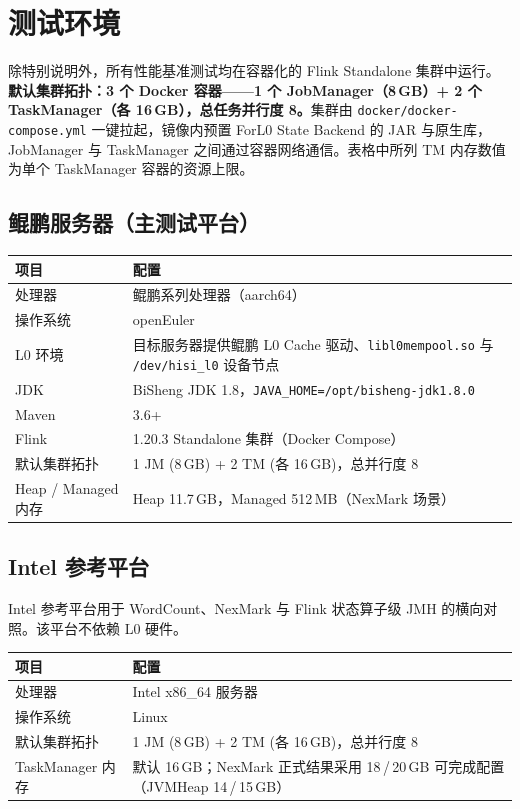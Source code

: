 \documentclass[a4paper,11pt]{article}
\newcommand{\project}{ForL0 State Backend}
\begin{document}
\section{测试环境}

除特别说明外，所有性能基准测试均在容器化的 Flink Standalone 集群中运行。\textbf{默认集群拓扑：3 个 Docker 容器——1 个 JobManager（8\,GB）+ 2 个 TaskManager（各 16\,GB），总任务并行度 8。}集群由 \texttt{docker/docker-compose.yml} 一键拉起，镜像内预置 \project{} 的 JAR 与原生库，JobManager 与 TaskManager 之间通过容器网络通信。表格中所列 TM 内存数值为单个 TaskManager 容器的资源上限。

\subsection{鲲鹏服务器（主测试平台）}

\begin{table}[H]
\centering
\small
\begin{tabularx}{\textwidth}{L{3.2cm} X}
\toprule
\textbf{项目} & \textbf{配置} \\
\midrule
处理器 & 鲲鹏系列处理器（aarch64） \\
操作系统 & openEuler \\
L0 环境 & 目标服务器提供鲲鹏 L0 Cache 驱动、\texttt{libl0mempool.so} 与 \texttt{/dev/hisi\_l0} 设备节点 \\
JDK & BiSheng JDK 1.8，\texttt{JAVA\_HOME=/opt/bisheng-jdk1.8.0} \\
Maven & 3.6+ \\
Flink & 1.20.3 Standalone 集群（Docker Compose） \\
默认集群拓扑 & 1 JM (8\,GB) + 2 TM (各 16\,GB)，总并行度 8 \\
Heap / Managed 内存 & Heap 11.7\,GB，Managed 512\,MB（NexMark 场景） \\
\bottomrule
\end{tabularx}
\end{table}

\subsection{Intel 参考平台}

Intel 参考平台用于 WordCount、NexMark 与 Flink 状态算子级 JMH 的横向对照。该平台不依赖 L0 硬件。

\begin{table}[H]
\centering
\small
\begin{tabularx}{\textwidth}{L{3.2cm} X}
\toprule
\textbf{项目} & \textbf{配置} \\
\midrule
处理器 & Intel x86\_64 服务器 \\
操作系统 & Linux \\
默认集群拓扑 & 1 JM (8\,GB) + 2 TM (各 16\,GB)，总并行度 8 \\
TaskManager 内存 & 默认 16\,GB；NexMark 正式结果采用 18\,/\,20\,GB 可完成配置（JVMHeap 14\,/\,15\,GB） \\
\bottomrule
\end{tabularx}
\end{table}
\end{document}
